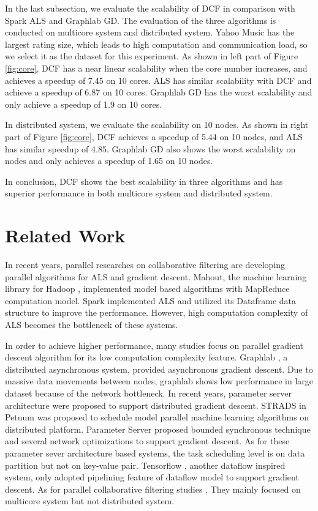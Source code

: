 \documentclass{llncs}
\begin{document}
In the last subsection, we evaluate the scalability of DCF in comparison with Spark ALS and Graphlab GD. The evaluation of the three algorithms is conducted on multicore system and distributed system. Yahoo Music has the largest rating size, which leads to high computation and communication load, so we select it as the dataset for this experiment. As shown in left part of Figure \ref{fig:core}, DCF has a near linear scalability when the core number increases, and achieves a speedup of 7.45 on 10 cores. ALS has similar scalability with DCF and achieve a speedup of 6.87 on 10 cores. Graphlab GD has the worst scalability and only achieve a speedup of 1.9 on 10 cores.

In distributed system, we evaluate the scalability on 10 nodes. As shown in right part of Figure \ref{fig:core}, DCF achieves a speedup of 5.44 on 10 nodes, and ALS has similar speedup of 4.85. Graphlab GD also shows the worst scalability on nodes and only achieves a speedup of 1.65 on 10 nodes.

In conclusion, DCF shows the best scalability in three algorithms and has superior performance in both multicore system and distributed system.

\vspace{-10pt}
\section{Related Work}
\label{sec:relatedWork}
\vspace{-5pt}
In recent years, parallel researches on collaborative filtering are developing parallel algorithms for ALS and gradient descent. Mahout, the machine learning library for Hadoop \cite{Hadoop}, implemented model based algorithms with MapReduce \cite{MapReduce} computation model. Spark \cite{SparkMllib} implemented ALS \cite{SparkCF} and utilized its Dataframe \cite{dataFrame}  data structure to improve the performance. However, high computation complexity of ALS becomes the bottleneck of these systems.

In order to achieve higher performance, many studies focus on parallel gradient descent algorithm for its low computation complexity feature. Graphlab \cite{graphlab}, a distributed asynchronous system, provided asynchronous gradient descent. Due to massive data movements between nodes, graphlab shows low performance in large dataset because of the network bottleneck.
In recent years, parameter server architecture were proposed to support distributed gradient descent. STRADS \cite{strads} in Petuum was proposed to schedule model parallel machine learning algorithms on distributed platform. Parameter Server \cite{ps} proposed bounded synchronous technique and several network optimizations to support gradient descent. As for these parameter sever architecture based systems, the task scheduling level is on data partition but not on key-value pair. Tensorflow \cite{tensorflow}, another dataflow inspired system, only adopted pipelining feature of dataflow model to support gradient descent. As for parallel collaborative filtering studies \cite{sgdFast2015} \cite{sgdKdd2015} \cite{StarPU}, They mainly focused on multicore system but not distributed system.
\vspace{-15pt}
\end{document}
